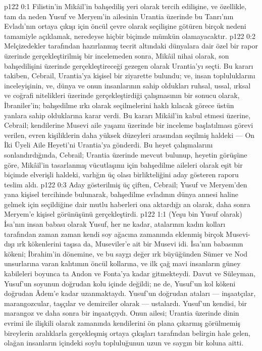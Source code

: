 \vs p122 0:1 Filistin’in Mikâil’in bahşediliş yeri olarak tercih edilişine, ve özellikle, tam da neden Yusuf ve Meryem’in ailesinin Urantia üzerinde bu Tanrı’nın Evladı’nın ortaya çıkışı için öncül çevre olarak seçilişine götüren birçok nedeni tamamiyle açıklamak, neredeyse hiçbir biçimde mümkün olamayacaktır.
\vs p122 0:2 Melçizedekler tarafından hazırlanmış tecrit altındaki dünyalara dair özel bir rapor üzerinde gerçekleştirilmiş bir incelemeden sonra, Mikâil nihai olarak, son bahşedilişini üzerinde gerçekleştireceği gezegen olarak Urantia’yı seçti. Bu kararı takiben, Cebrail, Urantia’ya kişisel bir ziyarette bulundu; ve, insan topluluklarını inceleyişinin, ve, dünya ve onun insanlarının sahip oldukları ruhsal, ussal, ırksal ve coğrafi nitelikleri üzerinde gerçekleştirdiği çalışmasının bir sonucu olarak, İbraniler’in; bahşedilme ırkı olarak seçilmelerini haklı kılacak görece üstün yanlara sahip olduklarına karar verdi. Bu kararı Mikâil’in kabul etmesi üzerine, Cebrail; kendilerine Musevi aile yaşamı üzerinde bir inceleme başlatılması görevi verilen, evren kişiliklerin daha yüksek düzeyleri arasından seçilmiş haldeki --- On İki Üyeli Aile Heyeti’ni Urantia’ya gönderdi. Bu heyet çalışmalarını sonlandırdığında, Cebrail; Urantia üzerinde mevcut bulunup, heyetin görüşüne göre, Mikâil’in tasarlanmış vücutlaşımı için bahşedilme aileleri olarak eşit bir biçimde elverişli haldeki, varlığın üç olası birlikteliğini aday gösteren raporu teslim aldı.
\vs p122 0:3 Aday gösterilmiş üç çiften, Cebrail; Yusuf ve Meryem’den yana kişisel tercihinde bulunarak, bahşedilme evladının dünya annesi haline gelmek için seçildiğine dair mutlu haberleri ona aktardığı an olarak, daha sonra Meryem’e kişisel görünüşünü gerçekleştirdi.
\vs p122 1:1 (Yeşu bin Yusuf olarak) İsa’nın insan babası olarak Yusuf, her ne kadar, atalarının kadın kolları tarafından zaman zaman kendi soy ağacına zamanında eklenmiş birçok Musevi\hyp{}dışı ırk kökenlerini taşısa da, Museviler’e ait bir Musevi idi. İsa’nın babasının kökeni; İbrahim’in dönemine, ve bu saygı değer ırk büyüğünden Sümer ve Nod unsurlarına varan kalıtımın öncül kollarına, ve ilk çağ mavi insanların güney kabileleri boyunca ta Andon ve Fonta’ya kadar gitmekteydi. Davut ve Süleyman, Yusuf’un soyunun doğrudan kolu içinde değildi; ne de, Yusuf’un kol kökeni doğrudan Âdem’e kadar uzanmaktaydı. Yusuf’un doğrudan ataları --- inşaatçılar, marangozcular, taşçılar ve demirciler olarak --- ustalardı. Yusuf’un kendisi, bir marangoz ve daha sonra bir inşaatçıydı. Onun ailesi; Urantia üzerinde dinin evrimi ile ilişkili olarak zamanında kendilerini ön plana çıkarmış görülmemiş bireylerin aralıklarla gerçekleşmiş ortaya çıkışları tarafından belirgin hale gelen, olağan insanların içindeki soylu topluluğunun uzun ve saygın bir koluna aitti.
